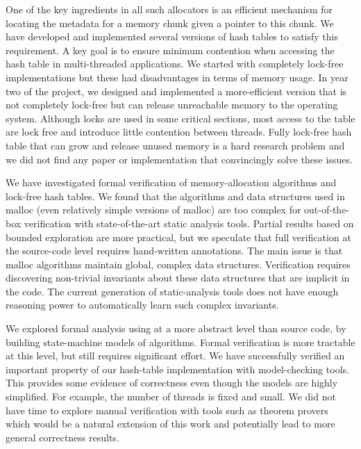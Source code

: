 \documentclass[twoside,12pt]{cslreport}
\begin{document}
One of the key ingredients in all such allocators is an efficient
mechanism for locating the metadata for a memory chunk given a pointer
to this chunk. We have developed and implemented several versions of
hash tables to satisfy this requirement. A key goal is to ensure
minimum contention when accessing the hash table in multi-threaded
applications. We started with completely lock-free implementations but
these had disadvantages in terms of memory usage. In year two of the
project, we designed and implemented a more-efficient version that is
not completely lock-free but can release unreachable memory to the
operating system. Although locks are used in some critical sections,
most access to the table are lock free and introduce little contention
between threads. Fully lock-free hash table that can grow and release
unused memory is a hard research problem and we did not find any paper
or implementation that convincingly solve these issues.

We have investigated formal verification of memory-allocation
algorithms and lock-free hash tables. We found that the algorithms and
data structures used in malloc (even relatively simple versions of
malloc) are too complex for out-of-the-box verification with
state-of-the-art static analysis tools. Partial results based on
bounded exploration are more practical, but we speculate that full
verification at the source-code level requires hand-written
annotations. The main issue is that malloc algorithms maintain global,
complex data structures. Verification requires discovering non-trivial
invariants about these data structures that are implicit in the
code. The current generation of static-analysis tools does not have
enough reasoning power to automatically learn such complex invariants.

We explored formal analysis using at a more abstract level than source
code, by building state-machine models of algorithms. Formal
verification is more tractable at this level, but still requires
significant effort.  We have successfully verified an important
property of our hash-table implementation with model-checking tools.
This provides some evidence of correctness even though the models are
highly simplified. For example, the number of threads is fixed and
small. We did not have time to explore manual verification with tools
such as theorem provers which would be a natural extension of this
work and potentially lead to more general correctness results.



\end{document}
